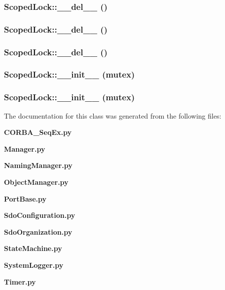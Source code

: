 \subsubsection{\setlength{\rightskip}{0pt plus 5cm}Scoped\-Lock::\_\-\_\-del\_\-\_\- ()}\label{classScopedLock_ScopedLocka4}


\subsubsection{\setlength{\rightskip}{0pt plus 5cm}Scoped\-Lock::\_\-\_\-del\_\-\_\- ()}\label{classScopedLock_ScopedLocka3}


\subsubsection{\setlength{\rightskip}{0pt plus 5cm}Scoped\-Lock::\_\-\_\-del\_\-\_\- ()}\label{classScopedLock_ScopedLocka1}


\subsubsection{\setlength{\rightskip}{0pt plus 5cm}Scoped\-Lock::\_\-\_\-init\_\-\_\- (mutex)}\label{classScopedLock_ScopedLocka2}


\subsubsection{\setlength{\rightskip}{0pt plus 5cm}Scoped\-Lock::\_\-\_\-init\_\-\_\- (mutex)}\label{classScopedLock_ScopedLocka0}




The documentation for this class was generated from the following files:\begin{CompactItemize}
\item 
{\bf CORBA\_\-Seq\-Ex.py}\item 
{\bf Manager.py}\item 
{\bf Naming\-Manager.py}\item 
{\bf Object\-Manager.py}\item 
{\bf Port\-Base.py}\item 
{\bf Sdo\-Configuration.py}\item 
{\bf Sdo\-Organization.py}\item 
{\bf State\-Machine.py}\item 
{\bf System\-Logger.py}\item 
{\bf Timer.py}\end{CompactItemize}
